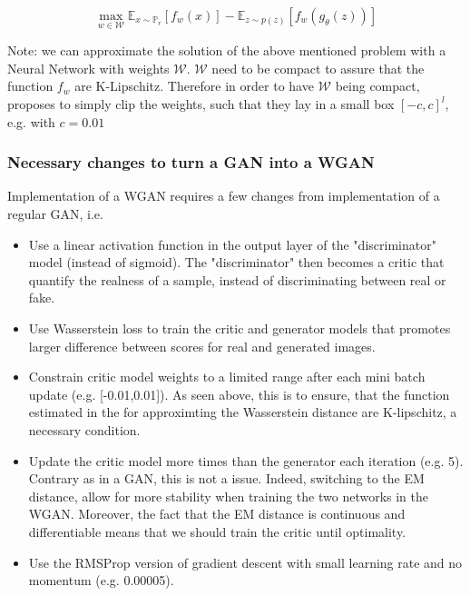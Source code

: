 \documentclass[11pt,a4paper,twoside]{report}
\begin{document}
\begin{equation}
    \max_{w \in \mathcal{W}}  \mathbb{E}_{x \sim \mathbb{P}_r}[f_w(x)] - \mathbb{E}_{z \sim p(z)}[f_w(g_{\theta}(z))]
\end{equation}

Note: we can approximate the solution of the above mentioned problem with a Neural Network with weights $\mathcal{W}$. $\mathcal{W}$ need to be compact to assure that the function $f_w$ are K-Lipschitz. Therefore in order to have $\mathcal{W}$ being compact, \cite{arjovsky2017wasserstein} proposes to simply clip the weights, such that they lay in a small box $[-c, c]^l$, e.g. with $c = 0.01$

\subsubsection{Necessary changes to turn a GAN into a WGAN}

Implementation of a WGAN requires a few changes from implementation of a regular GAN, i.e. 

\begin{itemize}
    \item Use a linear activation function in the output layer of the "discriminator" model (instead of sigmoid). The "discriminator" then becomes a critic that quantify the realness of a sample, instead of discriminating between real or fake.
    \item Use Wasserstein loss to train the critic and generator models that promotes larger difference between scores for real and generated images. 
    \item Constrain critic model weights to a limited range after each mini batch update (e.g. [-0.01,0.01]). As seen above, this is to ensure, that the function estimated in the for approximting the Wasserstein distance are K-lipschitz, a necessary condition.
    \item Update the critic model more times than the generator each iteration (e.g. 5). Contrary as in a GAN, this is not a issue. Indeed, switching to the EM distance, allow for more stability when training the two networks in the WGAN. Moreover, the fact that the EM distance is continuous and differentiable means that we should train the critic until optimality.
    \item Use the RMSProp version of gradient descent with small learning rate and no momentum (e.g. 0.00005).
    
\end{itemize}
\end{document}
